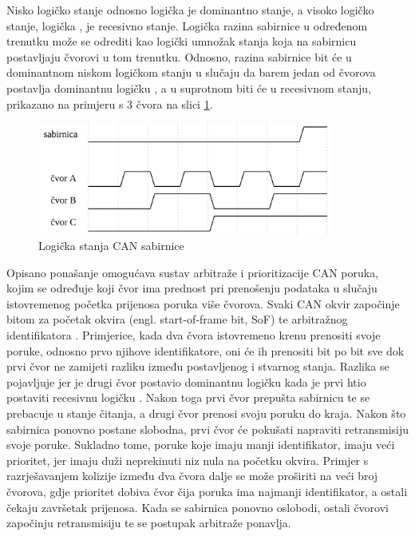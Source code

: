 \documentclass[times, utf8, diplomski, numeric]{fer}
\begin{document}
Nisko logičko stanje odnosno logička \grqq je dominantno stanje, a visoko logičko stanje, logička \grqq, je recesivno stanje. Logička razina sabirnice u određenom trenutku može se odrediti kao logički umnožak stanja koja na sabirnicu postavljaju čvorovi u tom trenutku. Odnosno, razina sabirnice bit će u dominantnom niskom logičkom stanju u slučaju da barem jedan od čvorova postavlja dominantnu logičku \grqq, a u suprotnom biti će u recesivnom stanju, prikazano na primjeru s 3 čvora na slici \ref{fig:sabirnica}. 
\newpage
\begin{figure}[htb]
\centering
\includegraphics[width=275pt]{slike/sabirnica.png}
\caption{Logička stanja CAN sabirnice}
\label{fig:sabirnica}
\end{figure}

Opisano ponašanje omogućava sustav arbitraže i prioritizacije CAN poruka, kojim se određuje koji čvor ima prednost pri prenošenju podataka u slučaju istovremenog početka prijenosa poruka više čvorova. Svaki CAN okvir započinje bitom za početak okvira (engl. start-of-frame bit, SoF) te arbitražnog identifikatora . Primjerice, kada dva čvora istovremeno krenu prenositi svoje poruke, odnosno prvo njihove identifikatore, oni će ih prenositi bit po bit sve dok prvi čvor ne zamijeti razliku između postavljenog i stvarnog stanja. Razlika se pojavljuje jer je drugi čvor postavio dominantnu logičku \grqq kada je prvi htio postaviti recesivnu logičku \grqq. Nakon toga prvi čvor prepušta sabirnicu te se prebacuje u stanje čitanja, a drugi čvor prenosi svoju poruku do kraja. Nakon što sabirnica ponovno postane slobodna, prvi čvor će pokušati napraviti retransmisiju svoje poruke. Sukladno tome, poruke koje imaju manji identifikator, imaju veći prioritet, jer imaju duži neprekinuti niz nula na početku okvira. Primjer s razrješavanjem kolizije između dva čvora dalje se može proširiti na veći broj čvorova, gdje prioritet dobiva čvor čija poruka ima najmanji identifikator, a ostali čekaju završetak prijenosa. Kada se sabirnica ponovno oslobodi, ostali čvorovi započinju retransmisiju te se postupak arbitraže ponavlja.
\end{document}
